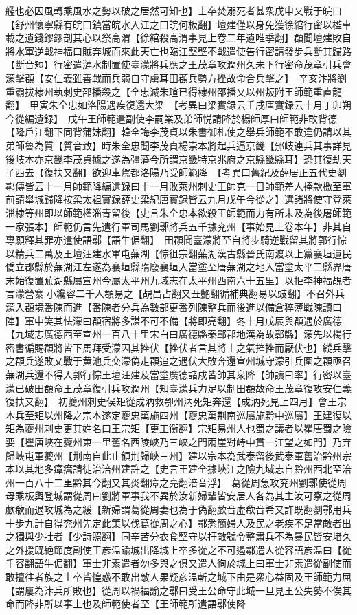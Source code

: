 艦也必因風轉乘風水之勢以破之居然可知也】士卒焚溺死者甚衆戊申又戰于皖口【舒州懷寧縣有皖口鎮當皖水入江之口皖何板翻】壇建僅以身免獲徐綰行密以檻車載之遺錢鏐鏐剖其心以祭高渭【徐綰殺高渭事見上卷二年遺唯季翻】頵聞壇建敗自將水軍逆戰神福曰賊弃城而來此天亡也臨江堅壁不戰遣使告行密請發步兵斷其歸路【斷音短】行密遣漣水制置使臺濛將兵應之王茂章攻潤州久未下行密命茂章引兵會濛擊頵【安仁義雖善戰而兵弱自守虜耳田頵兵勢方挫故命合兵擊之】　辛亥汴將劉重霸拔棣州執刺史邵播殺之【全忠滅朱瑄已得棣州邵播又以州叛附王師範重直龍翻】　甲寅朱全忠如洛陽遇疾復還大梁　【考異曰梁實録云壬戌唐實録云十月丁卯朔今從編遺録】　戊午王師範遣副使李嗣業及弟師悦請降於楊師厚曰師範非敢背德【降戶江翻下同背蒲妹翻】韓全誨李茂貞以朱書御札使之舉兵師範不敢違仍請以其弟師魯為質【質音致】時朱全忠聞李茂貞楊崇本將起兵逼京畿【邠岐連兵其事詳見後岐本亦京畿李茂貞據之遂為彊藩今所謂京畿特京兆府之京縣畿縣耳】恐其復劫天子西去【復扶又翻】欲迎車駕都洛陽乃受師範降　【考異曰舊紀及薛居正五代史劉鄩傳皆云十一月師範降編遺録曰十一月敗萊州刺史王師克一日師範差人捧款檄至軍前請舉城歸降按梁太祖實録薛史梁紀唐實録皆云九月戊午今從之】選諸將使守登萊淄棣等州即以師範權淄青留後【史言朱全忠本欲殺王師範而力有所未及為後屠師範一家張本】師範仍言先遣行軍司馬劉鄩將兵五千據兖州【事始見上卷本年】非其自專願釋其罪亦遣使語鄩【語牛倨翻】　田頵聞臺濛將至自將步騎逆戰留其將郭行悰以精兵二萬及王壇汪建水軍屯蕪湖【悰徂宗翻蕪湖漢古縣晉氏南渡以上黨襄垣遺民僑立郡縣於蕪湖江左遂為襄垣縣隋廢襄垣入當塗至唐蕪湖之地入當塗太平二縣界唐末始復置蕪湖縣屬宣州今屬太平州九域志在太平州西南六十五里】以拒李神福覘者言濛營寨小纔容二千人頵易之【覘昌占翻又丑艶翻徧補典翻易以豉翻】不召外兵濛入頵境番陳而進【番陳者分兵為數部更番列陳整兵而後進以備倉猝薄戰陳讀曰陣】軍中笑其怯濛曰頵宿將多謀不可不備【將即亮翻】冬十月戊辰與頵遇於廣德【九域志廣德西至宣州一百八十里宋白曰廣德縣秦鄣郡地漢為故鄣縣】濛先以楊行密書徧賜頵將皆下馬拜受濛因其挫伏【挫伏者言其將士之氣摧挫而厭伏也】縱兵擊之頵兵遂敗又戰于黄池兵交濛偽走頵追之遇伏大敗奔還宣州城守濛引兵圍之頵亟召蕪湖兵還不得入郭行悰王壇汪建及當塗廣德諸戍皆帥其衆降【帥讀曰率】行密以臺濛已破田頵命王茂章復引兵攻潤州【知臺濛兵力足以制田頵故命王茂章復攻安仁義復扶又翻】　初夔州刺史侯矩從成汭救卾州汭死矩奔還【成汭死見上四月】會王宗本兵至矩以州降之宗本遂定夔忠萬施四州【夔忠萬荆南巡屬施黔中巡屬】王建復以矩為夔州刺史更其姓名曰王宗矩【更工衡翻】宗矩易州人也蜀之議者以瞿唐蜀之險要【瞿唐峽在夔州東一里舊名西陵峽乃三峽之門兩崖對峙中貫一江望之如門】乃弃歸峽屯軍夔州【荆南自此止領荆歸峽三州】建以宗本為武泰留後武泰軍舊治黔州宗本以其地多瘴癘請徙治涪州建許之【史言王建全據峽江之險九域志自黔州西北至涪州一百八十二里黔其今翻又其炎翻瘴之亮翻涪音浮】　葛從周急攻兖州劉鄩使從周母乘板輿登城謂從周曰劉將軍事我不異於汝新婦輩皆安居人各為其主汝可察之從周歔欷而退攻城為之緩【新婦謂葛從周妻也為于偽翻歔音虛欷音希又許既翻劉鄩用兵十步九計自得兖州先定此策以伐葛從周之心】鄩悉簡婦人及民之老疾不足當敵者出之獨與少壯者【少詩照翻】同辛苦分衣食堅守以扞敵號令整肅兵不為暴民皆安堵久之外援既絶節度副使王彦温踰城出降城上卒多從之不可遏鄩遣人從容語彦温曰【從千容翻語牛倨翻】軍士非素遣者勿多與之俱又遣人徇於城上曰軍士非素遣從副使而敢擅往者族之士卒皆惶惑不敢出敵人果疑彦温斬之城下由是衆心益固及王師範力屈【謂屢為汴兵所敗也】從周以禍福諭之鄩曰受王公命守此城一旦見王公失勢不俟其命而降非所以事上也及師範使者至【王師範所遣語鄩使降